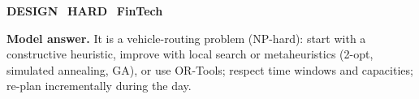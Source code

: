 \documentclass[11pt]{article}
\begin{document}
\begin{tcolorbox}[enhanced,breakable,colback=white,colframe=crimson,arc=2mm,boxrule=0.8pt,left=3mm,right=3mm,
 title={\textbf{QII.12}\quad How would you optimise delivery routes for 200 vans each morning?},fonttitle=\color{white}\small,colbacktitle=crimson]
\colorbox{crimson!15}{\scriptsize\bfseries\color{crimson} DESIGN}\
\colorbox{crimson!15}{\scriptsize\bfseries\color{crimson} HARD}\
\colorbox{navy!8}{\scriptsize\bfseries\color{navy} FinTech}\par\smallskip
\textbf{\color{navy}Model answer.} It is a vehicle-routing problem (NP-hard): start with a constructive heuristic, improve with local search or metaheuristics (2-opt, simulated annealing, GA), or use OR-Tools; respect time windows and capacities; re-plan incrementally during the day.
\end{tcolorbox}
\end{document}

